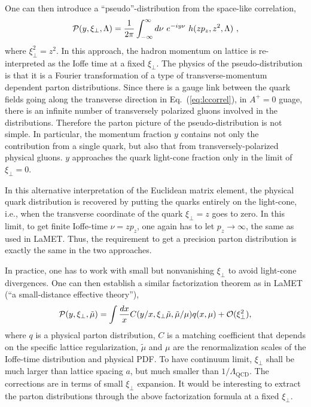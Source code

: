 One can then introduce a ``pseudo''-distribution from the space-like correlation,
\begin{equation}
{\cal P}(y, \xi_\perp, \Lambda) = \frac{1}{2\pi} \int^\infty_{-\infty}d\nu\ e^{-iy\nu}\ h(zp_z,z^2, \Lambda)\ ,
\end{equation}
where $\xi_\perp^2 = z^2$. In this approach, the hadron momentum on lattice
is re-interpreted as the Ioffe time at a fixed $\xi_\perp$.
The physics of the pseudo-distribution is that it is a Fourier transformation
of a type of transverse-momentum dependent parton distributions. Since there
is a gauge link between the quark fields going along the transverse direction
in Eq.~(\ref{eq:lccorrel}), in $A^+=0$ guage, there is an infinite number of transversely polarized
gluons involved in the distributions. Therefore the parton picture of the pseudo-distribution
is not simple. In particular, the momentum fraction $y$ contains not only the contribution
from a single quark, but also that from transversely-polarized physical gluons. $y$ approaches
the quark light-cone fraction only in the limit of $\xi_\perp=0$.

In this alternative interpretation of the Euclidean matrix element,
the physical quark distribution is recovered by putting the quarks entirely on the light-cone,
i.e., when the transverse coordinate of the quark $\xi_\perp = z$ goes to zero.
In this limit, to get finite Ioffe-time $\nu = zp_z$, one again has to let
$p_z \rightarrow\infty$, the same as used in LaMET. Thus, the requirement to
get a precision parton distribution is exactly the same in the two approaches.

In practice, one has to work with small but nonvanishing $\xi_\perp$ to avoid light-cone divergences.
One can then establish a similar factorization theorem as in LaMET (``a small-distance effective theory''),
\begin{equation}
{\cal P}(y, \xi_\perp,\tilde{\mu}) = \int \frac{dx}{x}
C(y/x, \xi_\perp\tilde{\mu},\tilde{\mu}/\mu) q(x, \mu) + {\cal O}(\xi^2_\perp),
\label{fac2}
\end{equation}
where $q$ is a physical parton distribution, $C$ is a matching coefficient that depends
on the specific lattice regularization, $\tilde{\mu}$ and $\mu$ are the renormalization scales of the Ioffe-time distribution and physical PDF.
To have continuum limit, $\xi_\perp$ shall be much
larger than lattice spacing $a$, but much smaller than $1/\Lambda_{\text{QCD}}$. The corrections are in terms of small $\xi_\perp$ expansion.
It would be interesting to extract the parton distributions through the above
factorization formula at a fixed $\xi_\perp$.

